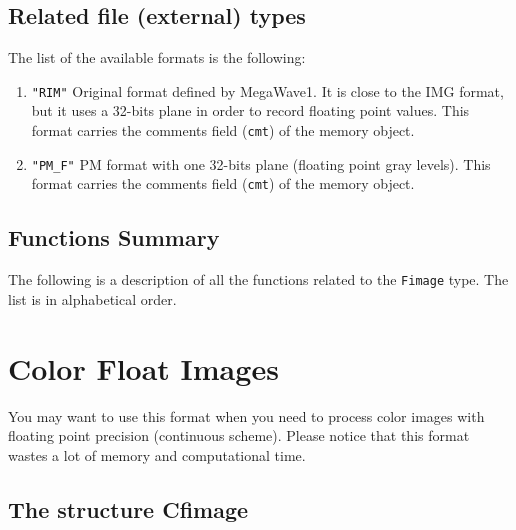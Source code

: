 \subsection{Related file (external) types}
\label{images_float-file_type}

The list of the available formats is the following:
\begin{enumerate}
\item \verb+"RIM"+ 
Original format defined by MegaWave1. 
It is close to the IMG format, but it uses a 32-bits plane in order to record floating point values.
This format carries the comments field (\verb+cmt+) of the memory object.
\item \verb+"PM_F"+  
PM format with one 32-bits plane (floating point gray levels).
This format carries the comments field (\verb+cmt+) of the memory object.
\end{enumerate}

\subsection{Functions Summary}
\label{images_float-images_function}

The following is a description of all the functions related to 
the \verb+Fimage+ type. The list is in alphabetical order.

\newpage %



\section{Color Float Images}

\label{images_color-float-images}

You may want to use this format when you need to process color images with
floating point precision (continuous scheme). 
Please notice that this format wastes a lot of memory and computational
time. 

\subsection{The structure Cfimage}
\label{images_color-float-images_structure}

